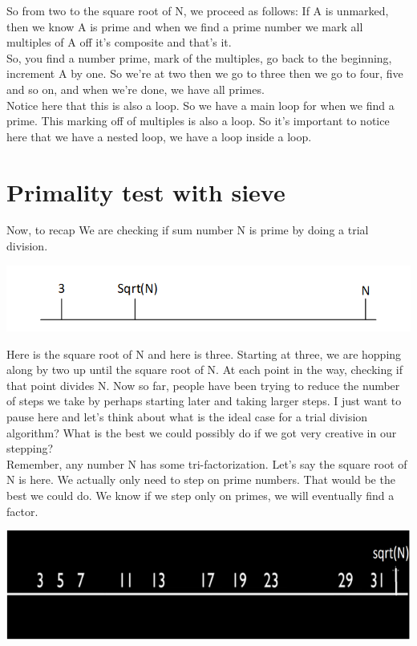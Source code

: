 \documentclass{report}
\begin{document}
So from two to the square root of N, we proceed as follows: If A is unmarked, then we know A is prime and when we find a prime number we mark all multiples of A off it's composite and that's it.\\
So, you find a number prime, mark of the multiples, go back to the beginning, increment A by one. So we're at two then we go to three then we go to four, five and so on, and when we're done, we have all primes.\\
Notice here that this is also a loop. So we have a main loop for when we find a prime. This marking off of multiples is also a loop. So it's important to notice here that we have a nested loop, we have a loop inside a loop. 
\newpage
\section{Primality test with sieve}
Now, to recap We are checking if sum number N is prime by doing a trial division. 
\begin{center}
	\includegraphics[scale=1]{53.png}
\end{center}
Here is the square root of N and here is three. Starting at three, we are hopping along by two up until the square root of N. At each point in the way, checking if that point divides N. Now so far, people have been trying to reduce the number of steps we take by perhaps starting later and taking larger steps. I just want to pause here and let's think about what is the ideal case for a trial division algorithm? What is the best we could possibly do if we got very creative in our stepping? \\
Remember, any number N has some tri-factorization. Let's say the square root of N is here. We actually only need to step on prime numbers. That would be the best we could do. We know if we step only on primes, we will eventually find a factor. 
\begin{center}
	\includegraphics[scale=1]{54.png}
\end{center}
\end{document}

